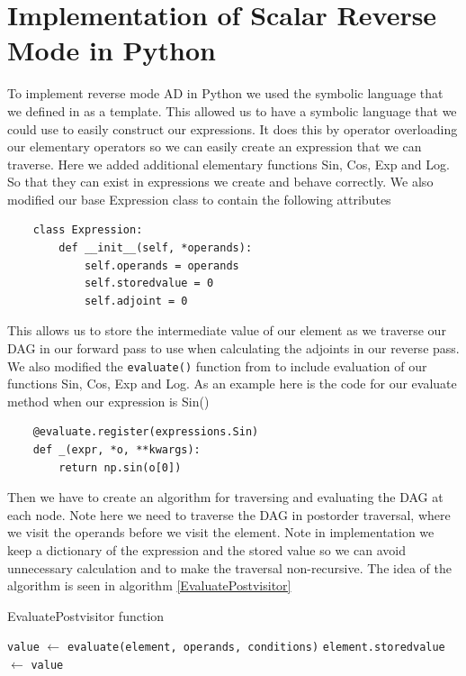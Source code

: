 \documentclass{article}
\begin{document}
\newpage
\section{Implementation of Scalar Reverse Mode in Python}

To implement reverse mode AD in Python we used the symbolic language that we defined in \cite{PoPBook} as a template. This allowed us to have a symbolic language that we could use to easily construct our expressions. It does this by operator overloading our elementary operators so we can easily create an expression that we can traverse. Here we added additional elementary functions Sin, Cos, Exp and Log. So that they can exist in expressions we create and behave correctly. We also modified our base Expression class to contain the following attributes
\begin{verbatim}
    class Expression:
        def __init__(self, *operands):
            self.operands = operands
            self.storedvalue = 0
            self.adjoint = 0
\end{verbatim}
This allows us to store the intermediate value of our element as we traverse our DAG in our forward pass to use when calculating the adjoints in our reverse pass.
We also modified the \verb|evaluate()| function from \cite{PoPBook} to include evaluation of our functions Sin, Cos, Exp and Log. As an example here is the code for our evaluate method when our expression is Sin()
\begin{verbatim}
    @evaluate.register(expressions.Sin)
    def _(expr, *o, **kwargs):
        return np.sin(o[0])
\end{verbatim}

Then we have to create an algorithm for traversing and evaluating the DAG at each node. Note here we need to traverse the DAG in postorder traversal, where we visit the operands before we visit the element. Note in implementation we keep a dictionary of the expression and the stored value so we can avoid unnecessary calculation and to make the traversal non-recursive. The idea of the algorithm is seen in algorithm \ref{EvaluatePostvisitor}

\begin{algorithm}[h!]
\caption{EvaluatePostvisitor function}\label{EvaluatePostvisitor}
\begin{algorithmic}[1]
\State \verb|value| $\gets$ \verb|evaluate(element, operands, conditions)|
\State \verb|element.storedvalue| $\gets$ \verb|value|
\EndFor
\EndProcedure
\end{algorithmic}
\end{algorithm}
\end{document}
